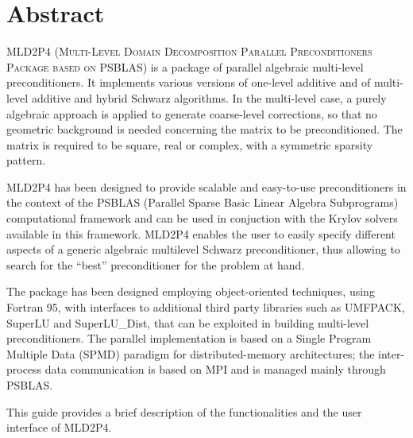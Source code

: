 \section*{Abstract}
\textsc{MLD2P4 (Multi-Level Domain Decomposition Parallel Preconditioners Package based on
PSBLAS}) is a package of parallel algebraic multi-level preconditioners.
It implements various versions of one-level additive and of multi-level additive
and hybrid Schwarz algorithms. In the multi-level case, a purely algebraic approach
is applied to generate coarse-level corrections, so that no geometric background is needed
concerning the matrix to be preconditioned. The matrix is required to be square, real
or complex, with a symmetric sparsity pattern. 

MLD2P4 has been designed to provide scalable and easy-to-use preconditioners in the
context of the PSBLAS (Parallel Sparse Basic Linear Algebra Subprograms)
computational framework and can be used in conjuction with the Krylov solvers
available in this framework. MLD2P4 enables the user to easily specify different aspects
of a generic algebraic multilevel Schwarz preconditioner, thus allowing to search
for the ``best'' preconditioner for the problem at hand. 

The package has been designed  employing object-oriented techniques,
using Fortran 95, with interfaces to additional third party libraries
such as UMFPACK, SuperLU and SuperLU\_Dist, that
can be exploited in building multi-level preconditioners. The parallel
implementation is based on a Single Program Multiple Data (SPMD)
paradigm for distributed-memory architectures; the inter-process data
communication is based on MPI and is managed mainly through PSBLAS.

This guide provides a brief description of the functionalities and
the user interface of MLD2P4.
